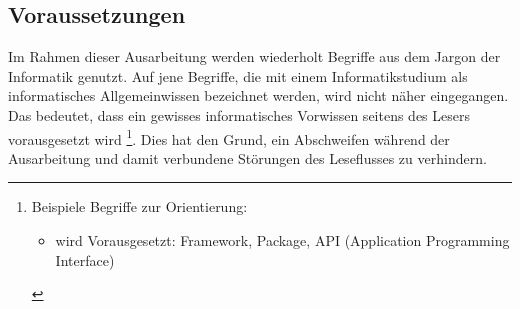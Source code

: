 \subsection{Voraussetzungen}
Im Rahmen dieser Ausarbeitung werden wiederholt Begriffe aus dem Jargon der Informatik genutzt. Auf jene Begriffe, die mit einem Informatikstudium als informatisches Allgemeinwissen bezeichnet werden, wird nicht näher eingegangen. Das bedeutet, dass ein gewisses informatisches Vorwissen seitens des Lesers vorausgesetzt wird%
\footnote{Beispiele Begriffe zur Orientierung:
	\begin{itemize}[noitemsep,topsep=0pt,parsep=0pt,partopsep=0pt]
		\item wird Vorausgesetzt: Framework, Package, API (Application Programming Interface)
	\end{itemize}
	\nointerlineskip %
}. \newline%
Dies hat den Grund, ein Abschweifen während der Ausarbeitung und damit verbundene Störungen des Leseflusses zu verhindern.%

%
%
